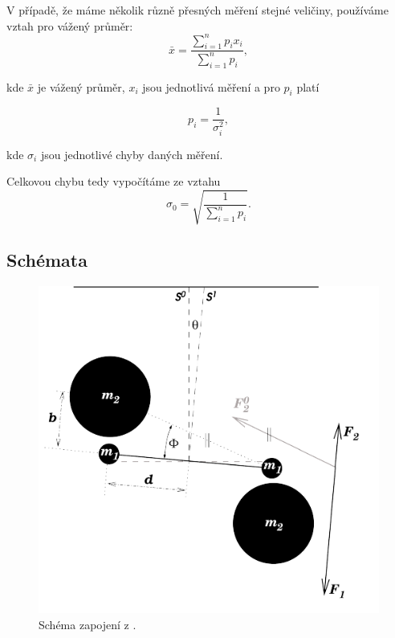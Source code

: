 \documentclass[english]{article}
\begin{document}
V případě, že máme několik různě přesných měření stejné veličiny, používáme vztah pro vážený průměr:
	\begin{equation} 
	\bar{x}=\frac{\sum\limits_{i=1}^{n}p_{i}x_{i}}{\sum\limits_{i=1}^{n}p_{i}},
	\end{equation}
	
	kde $\bar{x}$ je vážený průměr, $x_{i}$ jsou jednotlivá měření a pro $p_{i}$ platí
	 
	\begin{equation}
	p_{i}=\frac{1}{\sigma_{i}^{2}},
	\end{equation}
	
	kde $\sigma_{i}$ jsou jednotlivé chyby daných měření.
	 
	Celkovou chybu tedy vypočítáme ze vztahu
	\begin{equation} \label{eq:vazeny_prumer}
	\sigma_{0}=\sqrt{\frac{1}{\sum\limits_{i=1}^{n}p_{i}}}.
	\end{equation}
	
\clearpage
\subsection{Schémata}

	\begin{figure}[h!]
			\begin{center}
			    	\includegraphics[width=0.7\linewidth]{att/obr1.pdf}
					\caption{Schéma zapojení z \cite{bib:zadani}.}
					\label{fig:schema_1}
						    	
					
			\end{center}
		\end{figure}
		
\end{document}
